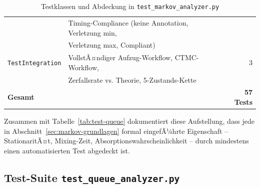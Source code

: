 ﻿\documentclass[a4paper,12pt]{report}
\theoremstyle{definition}
\begin{document}
\begin{table}
\begin{tabular}{@{}llr@{}}
		& Timing-Compliance (keine Annotation, Verletzung min, & \\
		& Verletzung max, Compliant) & \\
		\texttt{TestIntegration} & VollstÃ¤ndiger Aufzug-Workflow, CTMC-Workflow, & 3 \\
		& Zerfallsrate vs. Theorie, 5-Zustands-Kette & \\
		\midrule
		\textbf{Gesamt} & & \textbf{57 Tests} \\
		\bottomrule
	\end{tabular}
	\caption{Testklassen und Abdeckung in \texttt{test\_markov\_analyzer.py}}
\label{tab:test-markov}
	\label{tab:tests-markov}
\end{table}

Zusammen mit Tabelle~\ref{tab:test-queue} dokumentiert diese Aufstellung, dass jede in Abschnitt~\ref{sec:markov-grundlagen} formal eingefÃ¼hrte Eigenschaft -- StationaritÃ¤t, Mixing-Zeit, Absorptionswahrscheinlichkeit -- durch mindestens einen automatisierten Test abgedeckt ist.

\subsection{Test-Suite \texttt{test\_queue\_analyzer.py}}
\end{document}
